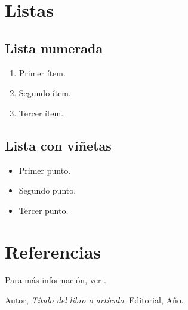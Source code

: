 \documentclass[a4paper,12pt]{article}
\begin{document}
\section{Listas}
\subsection{Lista numerada}
\begin{enumerate}
    \item Primer ítem.
    \item Segundo ítem.
    \item Tercer ítem.
\end{enumerate}

\subsection{Lista con viñetas}
\begin{itemize}
    \item Primer punto.
    \item Segundo punto.
    \item Tercer punto.
\end{itemize}

\section{Referencias}
Para más información, ver \cite{ref1}.

\begin{thebibliography}{9}
     Autor, \textit{Título del libro o artículo}. Editorial, Año.
\end{thebibliography}
\end{document}

